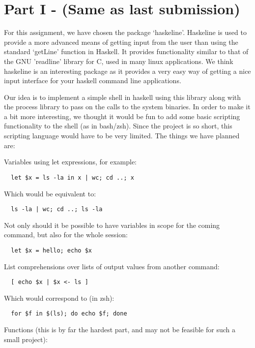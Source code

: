 \documentclass[11pt,a4paper]{article}
\begin{document}
\newpage
\appendix

\section{Part I - (Same as last submission)}
For this assignment, we have chosen the package ‘haskeline’. Haskeline is used
to provide a more advanced means of getting input from the user than using the
standard ‘getLine’ function in Haskell. It provides functionality similar to
that of the GNU 'readline' library for C, used in many linux applications. We
think haskeline is an interesting package as it provides a very easy way of
getting a nice input interface for your haskell command line applications.

Our idea is to implement a simple shell in haskell using this library along with
the process library to pass on the calls to the system binaries. In order to
make it a bit more interesting, we thought it would be fun to add some basic
scripting functionality to the shell (as in bash/zsh). Since the project is so
short, this scripting language would have to be very limited. The things we have
planned are:

Variables using let expressions, for example:
\begin{verbatim}
  let $x = ls -la in x | wc; cd ..; x
\end{verbatim}

Which would be equivalent to:

\begin{verbatim}
  ls -la | wc; cd ..; ls -la
\end{verbatim}

Not only should it be possible to have variables in scope for the coming
command, but also for the whole session:

\begin{verbatim}
  let $x = hello; echo $x
\end{verbatim}

List comprehensions over lists of output values from another command:

\begin{verbatim}
  [ echo $x | $x <- ls ]
\end{verbatim}

Which would correspond to (in zsh):

\begin{verbatim}
  for $f in $(ls); do echo $f; done
\end{verbatim}

Functions (this is by far the hardest part, and may not be feasible for such a
small project):
\end{document}
